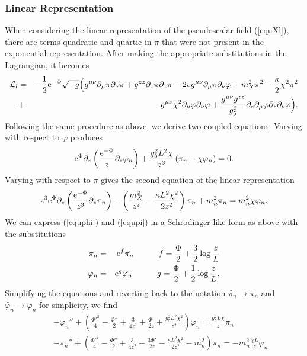 \subsubsection{Linear Representation}

When considering the linear representation of the pseudoscalar field (\ref{equXl}), there are terms quadratic and quartic in $\pi$ that were not present in the exponential representation. 
After making the appropriate substitutions in the Lagrangian, it becomes 
\begin{eqnarray}
\mathcal{L}_{l} & = & -\frac{1}{2}{\rm e}^{-\Phi}\sqrt{-g}\Big(g^{\mu\nu}\partial_{\mu}\pi\partial_{\nu}\pi+g^{zz}\partial_{z}\pi\partial_{z}\pi-2vg^{\mu\nu}\partial_{\mu}\pi\partial_{\nu}\varphi+m_{X}^{2}\pi^{2}-\frac{\kappa}{2}\chi^{2}\pi^{2}\nonumber \\
 & + & g^{\mu\nu}\chi^{2}\partial_{\mu}\varphi\partial_{\nu}\varphi+\frac{g^{\mu\nu}g^{zz}}{g_{5}^{2}}\partial_{z}\partial_{\mu}\varphi\partial_{z}\partial_{\nu}\varphi\Big).
\end{eqnarray}
Following the same procedure as above, we derive two coupled equations.
Varying with respect to $\varphi$ produces 
\begin{equation}
{\rm e}^{\Phi}\partial_{z}\left(\frac{{\rm e}^{-\Phi}}{z}\partial_{z}\varphi_{n}\right)+\frac{g_{5}^{2}L^{2}\chi}{z^{3}}\left(\pi_{n}-\chi\varphi_{n}\right)=0.\label{equphi}
\end{equation}
Varying with respect to $\pi$ gives the second equation of the linear representation 
\begin{equation}
z^{3}{\rm e}^{\Phi}\partial_{z}\left(\frac{{\rm e}^{-\Phi}}{z^{3}}\partial_{z}\pi_{n}\right)-\left(\frac{m_{X}^{2}}{z^{2}}-\frac{\kappa L^{2}\chi^{2}}{2z^{2}}\right)\pi_{n}+m_{n}^{2}\pi_{n}=m_{n}^{2}\chi\varphi_{n}.\label{equpi}
\end{equation}
 We can express (\ref{equphi}) and (\ref{equpi}) in a Schrodinger-like form as above %
with the substitutions 
\begin{eqnarray}
\pi_{n} & = & {\rm e}^{f}\tilde{\pi_{n}}\quad\quad\quad f=\frac{\Phi}{2}+\frac{3}{2}\log{\frac{z}{L}}\\
\varphi_{n} & = & {\rm e}^{g}\tilde{\varphi_{n}}\quad\quad\quad g=\frac{\Phi}{2}+\frac{1}{2}\log{\frac{z}{L}}.
\end{eqnarray}
Simplifying the equations and reverting back to the notation $\tilde{\pi_{n}}\rightarrow\pi_{n}$ and $\tilde{\varphi_{n}}\rightarrow\varphi_{n}$ for simplicity, we find  
\begin{eqnarray}
 &  & -\varphi_{n}''+\left(\frac{\Phi'^{2}}{4}-\frac{\Phi''}{2}+\frac{3}{4z^{2}}+\frac{\Phi'}{2z}+\frac{g_{5}^{2}L^{2}\chi^{2}}{z^{2}}\right)\varphi_{n}=\frac{g_{5}^{2}L\chi}{z}\pi_{n}\label{equSchphi}\\
 &  & -\pi_{n}''+\left(\frac{\Phi'^{2}}{4}-\frac{\Phi''}{2}+\frac{3}{4z^{2}}+\frac{3\Phi'}{2z}-\frac{\kappa L^{2}\chi^{2}}{2z^{2}}-m_{n}^{2}\right)\pi_{n}=-m_{n}^{2}\frac{\chi L}{z}\varphi_{n}\label{equSchpi}
\end{eqnarray}

